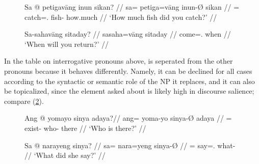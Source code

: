 \begin{figure}[h]
\pex\label{ex:qprondist}
\a\begingl
	\gla Sa @ petigavāng inun sikan? //
	\glb sa= petiga=vāng inun-Ø sikan //
	\glc \PatT{}= catch=\Second{}.\Aarg{} fish-\Top{} how.much //
	\glft `How much fish did you catch?' //
\endgl

\a\begingl
	\gla Sa-sahavāng sitaday? //
	\glb sa\til{}saha=vāng sitaday //
	\glc \Iter{}\til{}come=\Second{}.\Aarg{} when //
	\glft `When will you return?' //
\endgl
\xe
\end{figure}

In the table on interrogative pronouns above,  is seperated from the other pronouns because it behaves differently.
Namely, it can be declined for all cases according to the syntactic or semantic
role of the NP it replaces, and it can also be topicalized, since the element
asked about is likely high in discourse salience; compare (\ref{ex:qprotop}).

\begin{figure}[h]
\pex\label{ex:qprotop}
\a\begingl
	\gla Ang @ yomayo sinya adaya?\footnotemark //
	\glb ang= yoma-yo sinya-Ø adaya //
	\glc \AgtT{}= exist-\TsgN{} who-\Top{} there //
	\glft `Who is there?' //
\endgl

\a\begingl
	\gla Sa @ narayeng sinya? //
	\glb sa= nara=yeng sinya-Ø //
	\glc \PatT{}= say=\TsgF{}.\Aarg{} what-\Top{} //
	\glft `What did she say?' //
\endgl
\xe
\end{figure}


